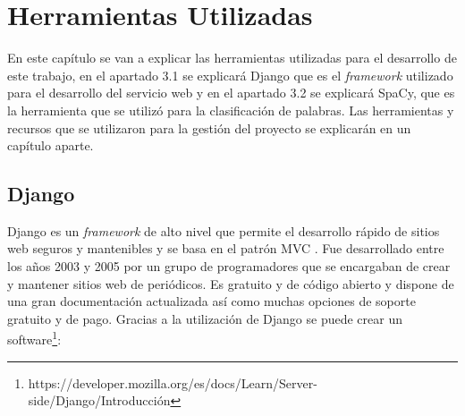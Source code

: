 \chapter{Herramientas Utilizadas}
\label{cap:herramientas}

En este capítulo se van a explicar las herramientas utilizadas para el desarrollo de este trabajo, en el apartado 3.1 se explicará Django que es el \textit{framework} utilizado para el desarrollo del servicio web y en el apartado 3.2 se explicará SpaCy, que es la herramienta que se utilizó para la clasificación de palabras. Las herramientas y recursos que se utilizaron para la gestión del proyecto se explicarán en un capítulo aparte.


\section{Django}
\label{cap:sec:django}
Django es un \textit{framework} de alto nivel que permite el desarrollo rápido de sitios web seguros y mantenibles y se basa en el patrón MVC \citep{TFGEmociones}. Fue desarrollado entre los años 2003 y 2005 por un grupo de programadores que se encargaban de crear y mantener sitios web de periódicos. 
Es gratuito y de código abierto y dispone de una gran documentación actualizada así como muchas opciones de soporte gratuito y de pago. Gracias a la utilización de Django se puede crear un software\footnote{https://developer.mozilla.org/es/docs/Learn/Server-side/Django/Introducción}:

